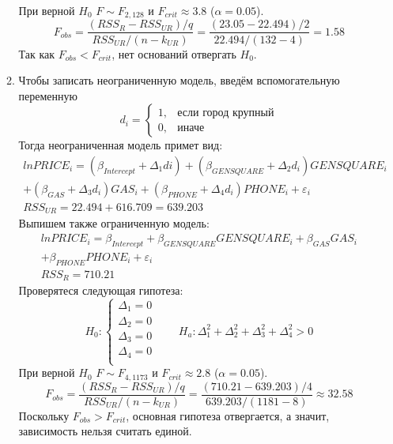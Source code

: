 \begin{enumerate}
\begin{enumerate}
При верной $H_0$ $F \sim F_{2, 128}$ и $F_{crit} \approx 3.8$ ($\alpha = 0.05$).
\[
F_{obs} = \frac{(RSS_R - RSS_{UR}) / q}{RSS_{UR}/(n - k_{UR})} = \frac{(23.05 - 22.494) / 2}{22.494 / (132 - 4)} = 1.58
\]
Так как $F_{obs} < F_{crit}$, нет оснований отвергать $H_0$.
\item Чтобы записать неограниченную модель, введём вспомогательную переменную
\[
d_i = \begin{cases}
1, & \text{если город крупный} \\
0, & \text{иначе}
\end{cases}
\]
Тогда неограниченная модель примет вид:
\begin{multline*}
lnPRICE_i = (\beta_{Intercept} + \Delta_1 di) + (\beta_{GENSQUARE} + \Delta_2 d_i) GENSQUARE_i \\
+ (\beta_{GAS} + \Delta_3 d_i) GAS_i + (\beta_{PHONE} + \Delta_4 d_i) PHONE_i + \varepsilon_i \\
RSS_{UR} = 22.494 + 616.709 = 639.203
\end{multline*}
Выпишем также ограниченную модель:
\begin{multline*}
lnPRICE_i = \beta_{Intercept} + \beta_{GENSQUARE} GENSQUARE_i + \beta_{GAS} GAS_i \\
+ \beta_{PHONE} PHONE_i + \varepsilon_i \\
RSS_{R} = 710.21
\end{multline*}
Проверятеся следующая гипотеза:
\[H_0:
\begin{cases}
  \Delta_1 = 0 \\
  \Delta_2 = 0 \\
  \Delta_3 = 0 \\
  \Delta_4 = 0 \\
\end{cases}
\qquad
H_a: \Delta_1^2 + \Delta_2^2 + \Delta_3^2+ \Delta_4^2 > 0
\]
При верной $H_0$ $F \sim F_{4, 1173}$ и $F_{crit} \approx 2.8$ ($\alpha = 0.05$).
\[
F_{obs} = \frac{(RSS_R - RSS_{UR}) / q}{RSS_{UR}/(n - k_{UR})} = \frac{(710.21 - 639.203)/4}{639.203/(1181-8)} \approx 32.58
\]
Поскольку $F_{obs} > F_{crit}$, основная гипотеза отвергается,
а значит, зависимость нельзя считать единой.
\end{enumerate}
\end{enumerate}
